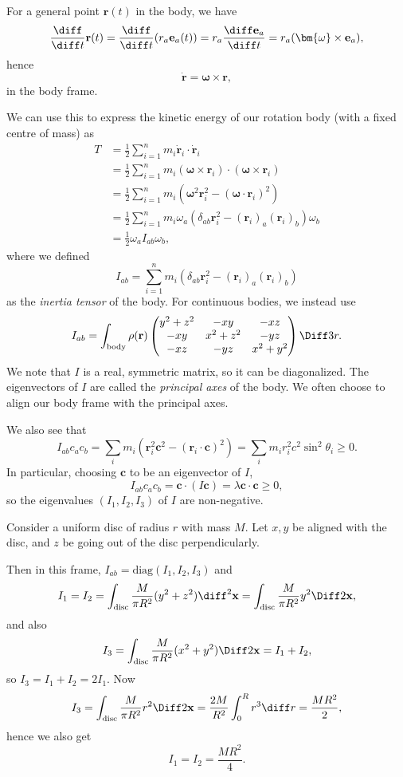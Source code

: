 \documentclass[12pt]{article}
\begin{document}
For a general point $\mathbf{r}(t)$ in the body, we have
\[
\frac{\diff}{\diff t}\mathbf{r}(t) = \frac{\diff}{\diff t}(r_a \mathbf{e}_a(t)) = r_a \frac{\diff \mathbf{e}_a}{\diff t} = r_a(\bm{\omega} \times \mathbf{e}_a),
\]
hence
\[
\mathbf{\dot r} = \bm{\omega} \times \mathbf{r},
\]
in the body frame.

We can use this to express the kinetic energy of our rotation body (with a fixed centre of mass) as
\begin{align*}
	T &= \frac{1}{2} \sum_{i = 1}^{n} m_i \mathbf{\dot r}_i \cdot \mathbf{\dot r}_i \\
	  &= \frac{1}{2} \sum_{i = 1}^{n} m_i (\bm{\omega} \times \mathbf{r}_i) \cdot (\bm{\omega} \times \mathbf{r}_i) \\
	  &= \frac{1}{2} \sum_{i = 1}^{n} m_i(\bm{\omega}^2 \mathbf{r}_i^2 - (\bm{\omega} \cdot \mathbf{r}_i)^2) \\
	  &= \frac{1}{2} \sum_{i = 1}^{n} m_i \omega_a (\delta_{ab} \mathbf{r}_i^2 - (\mathbf{r}_i)_{a} (\mathbf{r}_i)_{b} ) \omega_b \\
	  &= \frac{1}{2} \omega_a I_{ab} \omega_b,
\end{align*}
where we defined
\[
I_{ab} = \sum_{i = 1}^{n}m_i(\delta_{ab} \mathbf{r}_i^2 - (\mathbf{r}_i)_a (\mathbf{r}_i)_b)
\]
as the \emph{inertia tensor} of the body. For continuous bodies, we instead use
\[
I_{ab} = \int_{\mathrm{body}}\rho(\mathbf{r})
\begin{pmatrix}
	y^2+z^2&-xy&-xz\\
	-xy&x^2+z^2&-yz\\
	-xz&-yz&x^2+y^2
\end{pmatrix}
\Diff3 r.
\]
We note that $I$ is a real, symmetric matrix, so it can be diagonalized. The eigenvectors of $I$ are called the \emph{principal axes} of the body. We often choose to align our body frame with the principal axes.

We also see that
\[
I_{ab} c_a c_b = \sum_i m_i (\mathbf{r}_i^2 \mathbf{c}^2 - (\mathbf{r}_i \cdot \mathbf{c})^2) = \sum_i m_i r_i^2 c^2 \sin^2 \theta_i \geq 0.
\]
In particular, choosing $\mathbf{c}$ to be an eigenvector of $I$,
\[
I_{ab}c_ac_b = \mathbf{c} \cdot (I \mathbf{c}) = \lambda \mathbf{c} \cdot \mathbf{c} \geq 0,
\]
so the eigenvalues $(I_1, I_2, I_3)$ of $I$ are non-negative.

\begin{exbox}
	Consider a uniform disc of radius $r$ with mass $M$. Let $x, y$ be aligned with the disc, and $z$ be going out of the disc perpendicularly.

	Then in this frame, $I_{ab} = \mathrm{diag}(I_1, I_2, I_3)$ and
	\[
	I_1 = I_2 = \int_{\mathrm{disc}} \frac{M}{\pi R^2} (y^2 + z^2) \diff^2 \mathbf{x} = \int_{\mathrm{disc}} \frac{M}{\pi R^2} y^2 \Diff2 \mathbf{x},
	\]
	and also
	\[
	I_3 = \int_{\mathrm{disc}} \frac{M}{\pi R^2} (x^2 + y^2) \Diff2 \mathbf{x} = I_1 + I_2,
	\]
	so $I_3 = I_1 + I_2 = 2I_1$. Now
	\[
	I_3 = \int_{\mathrm{disc}} \frac{M}{\pi R^2} r^2 \Diff2 \mathbf{x} = \frac{2M}{R^2} \int_0^R r^3 \diff r = \frac{MR^2}{2},
	\]
	hence we also get
	\[
	I_1 = I_2 = \frac{MR^2}{4}.
	\]
\end{exbox}
\end{document}
